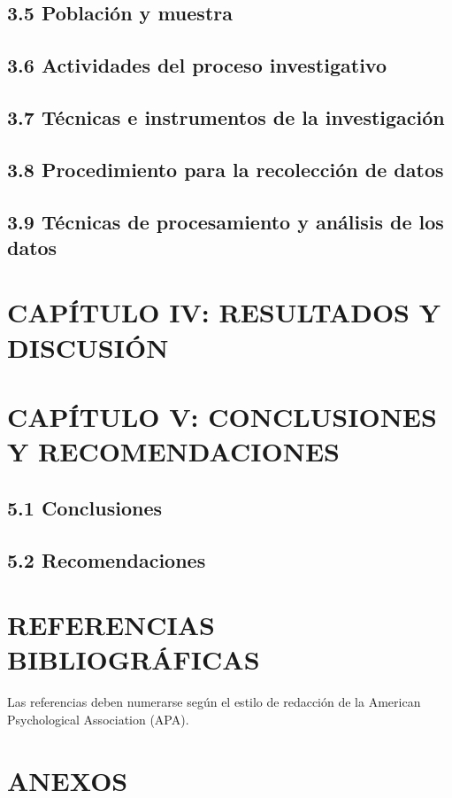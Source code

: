 \documentclass[12pt]{../componentes/uns}
\begin{document}
\subsection{3.5 Población y muestra}
\lipsum[19]

\subsection{3.6 Actividades del proceso investigativo}
\lipsum[20]

\subsection{3.7 Técnicas e instrumentos de la investigación}
\lipsum[21]

\subsection{3.8 Procedimiento para la recolección de datos}
\lipsum[22]

\subsection{3.9 Técnicas de procesamiento y análisis de los datos}
\lipsum[23]

\newpage
\section{CAPÍTULO IV: RESULTADOS Y DISCUSIÓN}
\lipsum[24]

\newpage
\section{CAPÍTULO V: CONCLUSIONES Y RECOMENDACIONES}
\subsection{5.1 Conclusiones}
\lipsum[25]

\subsection{5.2 Recomendaciones}
\lipsum[26]

\newpage
\section*{REFERENCIAS BIBLIOGRÁFICAS}
Las referencias deben numerarse según el estilo de redacción de la American Psychological Association (APA).

\newpage
\section*{ANEXOS}
\lipsum[27]
\end{document}
